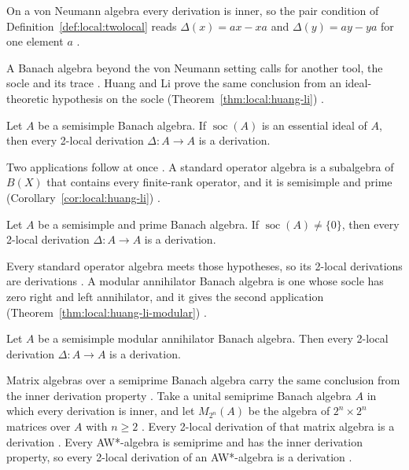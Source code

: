 On a von Neumann algebra every derivation is inner, so the pair condition
of Definition~\ref{def:local:twolocal} reads $\Delta(x)=ax-xa$ and
$\Delta(y)=ay-ya$ for one element $a$
\cite[p.~2]{AyupovKudaybergenov2015}.

A Banach algebra beyond the von Neumann setting calls for another tool, the
socle and its trace \cite[pp.~322--323]{HuangLi2021}. Huang and Li prove the same
conclusion from an ideal-theoretic hypothesis on the socle (Theorem~\ref{thm:local:huang-li})
\cite[Theorem~3.6, p.~5]{HuangLi2021}.\begin{theorem}\label{thm:local:huang-li}
Let $A$ be a semisimple Banach algebra. If $\operatorname{soc}(A)$ is an essential
ideal of $A$, then every 2-local derivation $\Delta\colon A\to A$ is a derivation.
\end{theorem}

Two applications follow at once \cite[Theorem~4.1 and Theorem~4.5, p.~7
and~328]{HuangLi2021}. A standard operator algebra is a subalgebra of $B(X)$
that contains every finite-rank operator, and it is semisimple and prime
(Corollary~\ref{cor:local:huang-li}) \cite[p.~326]{HuangLi2021}.

\begin{theorem}\label{cor:local:huang-li}
Let $A$ be a semisimple and prime Banach algebra. If
$\operatorname{soc}(A)\neq\{0\}$, then every 2-local derivation
$\Delta\colon A\to A$ is a derivation.
\end{theorem}

Every standard operator algebra meets those hypotheses, so its 2-local
derivations are derivations \cite[Corollary~4.2, p.~7]{HuangLi2021}. A
modular annihilator Banach algebra is one whose socle has zero right and left
annihilator, and it gives the second application
(Theorem~\ref{thm:local:huang-li-modular}) \cite[p.~328]{HuangLi2021}.

\begin{theorem}\label{thm:local:huang-li-modular}
Let $A$ be a semisimple modular annihilator Banach algebra. Then every 2-local
derivation $\Delta\colon A\to A$ is a derivation.
\end{theorem}

Matrix algebras over a semiprime Banach algebra carry the same conclusion from
the inner derivation property \cite[p.~2]{AyupovKudaybergenov2014Matrix}. Take
a unital semiprime Banach algebra $A$ in which every derivation is inner, and
let $M_{2^n}(A)$ be the algebra of $2^n\times 2^n$ matrices over $A$ with
$n\geq2$ \cite[Theorem~2.1, p.~2]{AyupovKudaybergenov2014Matrix}. Every
2-local derivation of that matrix algebra is a derivation \cite[Theorem~2.1,
p.~2]{AyupovKudaybergenov2014Matrix}. Every AW*-algebra is semiprime and has
the inner derivation property, so every 2-local derivation of an AW*-algebra
is a derivation \cite[Theorem~3.1, p.~11]{AyupovKudaybergenov2014Matrix}.

